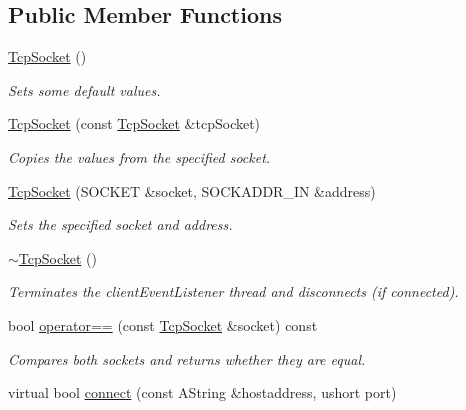 \subsection*{Public Member Functions}
\begin{DoxyCompactItemize}
\item 
\mbox{\label{class_tcp_socket_a132aa72af141d611f8bad96ba585a79f}} 
\mbox{\hyperlink{class_tcp_socket_a132aa72af141d611f8bad96ba585a79f}{Tcp\+Socket}} ()
\begin{DoxyCompactList}\small\item\em Sets some default values. \end{DoxyCompactList}\item 
\mbox{\hyperlink{class_tcp_socket_aac5a96f2ac3a824fb7c52260a6a6c2bd}{Tcp\+Socket}} (const \mbox{\hyperlink{class_tcp_socket}{Tcp\+Socket}} \&tcp\+Socket)
\begin{DoxyCompactList}\small\item\em Copies the values from the specified socket. \end{DoxyCompactList}\item 
\mbox{\hyperlink{class_tcp_socket_adc173be5af51b5ead7ef1f370453c2d2}{Tcp\+Socket}} (S\+O\+C\+K\+ET \&socket, S\+O\+C\+K\+A\+D\+D\+R\+\_\+\+IN \&address)
\begin{DoxyCompactList}\small\item\em Sets the specified socket and address. \end{DoxyCompactList}\item 
\mbox{\label{class_tcp_socket_a4c6d246451c51ac4226a9301f6711086}} 
\mbox{\hyperlink{class_tcp_socket_a4c6d246451c51ac4226a9301f6711086}{$\sim$\+Tcp\+Socket}} ()
\begin{DoxyCompactList}\small\item\em Terminates the client\+Event\+Listener thread and disconnects (if connected). \end{DoxyCompactList}\item 
bool \mbox{\hyperlink{class_tcp_socket_a282abf062b6536eaa57e8ef7fec7a122}{operator==}} (const \mbox{\hyperlink{class_tcp_socket}{Tcp\+Socket}} \&socket) const
\begin{DoxyCompactList}\small\item\em Compares both sockets and returns whether they are equal. \end{DoxyCompactList}\item 
virtual bool \mbox{\hyperlink{class_tcp_socket_a396dcc6c060e02611574c18474deedfc}{connect}} (const A\+String \&hostaddress, ushort port)

\end{DoxyCompactItemize}
